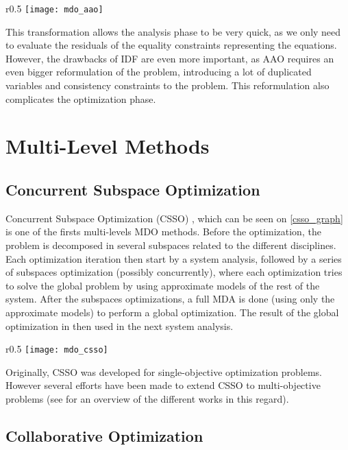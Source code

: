 \begin{wrapfigure}{r}{0.5\textwidth}
\centering
\texttt{[image: mdo\_aao]}
\caption{AAO method}\label{aao_graph}
\end{wrapfigure}

This transformation allows the analysis phase to be very quick, as we only need to evaluate the residuals of the equality constraints representing the equations.
However, the drawbacks of IDF are even more important, as AAO requires an even bigger reformulation of the problem, introducing a lot of duplicated variables and consistency  constraints to the problem. This reformulation also complicates the optimization phase.

\section{Multi-Level Methods}

\subsection{Concurrent Subspace Optimization}

Concurrent Subspace Optimization (CSSO) \cite{wujek1997concurrent}, which can be seen on \figurename{} \ref{csso_graph} is one of the firsts multi-levels MDO methods. Before the optimization, the problem is decomposed in several subspaces related to the different disciplines. Each optimization iteration then start by a system analysis, followed by a series of subspaces optimization (possibly concurrently), where each optimization tries to solve the global problem by using approximate models of the rest of the system. After the subspaces optimizations, a full MDA is done (using only the approximate models) to perform a global optimization. The result of the global optimization in then used in the next system analysis.

\begin{wrapfigure}{r}{0.5\textwidth}
\centering
\texttt{[image: mdo\_csso]}
\caption{CSSO method}\label{csso_graph}
\end{wrapfigure}

Originally, CSSO was developed for single-objective optimization problems. However several efforts have been made to extend CSSO to multi-objective problems (see \cite{zhang2011} for an overview of the different works in this regard).

\subsection{Collaborative Optimization}

